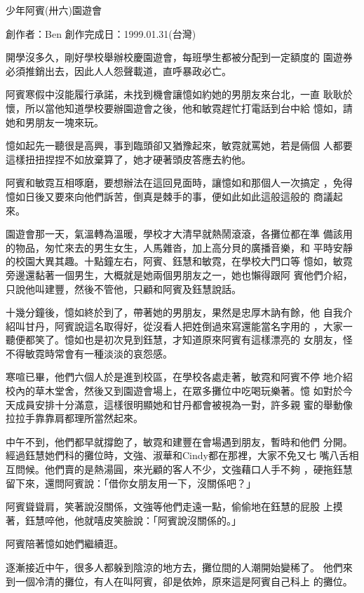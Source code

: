 



少年阿賓(卅六)園遊會

創作者：Ben
創作完成日：1999.01.31(台灣)


開學沒多久，剛好學校舉辦校慶園遊會，每班學生都被分配到一定額度的
園遊券必須推銷出去，因此人人怨聲載道，直呼暴政必亡。

阿賓寒假中沒能履行承諾，未找到機會讓憶如約她的男朋友來台北，一直
耿耿於懷，所以當他知道學校要辦園遊會之後，他和敏霓趕忙打電話到台中給
憶如，請她和男朋友一塊來玩。

憶如起先一聽很是高興，事到臨頭卻又猶豫起來，敏霓就罵她，若是倆個
人都要這樣扭扭捏捏不如放棄算了，她才硬著頭皮答應去約他。

阿賓和敏霓互相啄磨，要想辦法在這回見面時，讓憶如和那個人一次搞定
，免得憶如日後又要來向他們訴苦，倒真是棘手的事，便如此如此這般這般的
商議起來。

園遊會那一天，氣溫轉為溫暖，學校才大清早就熱鬧滾滾，各攤位都在準
備該用的物品，匆忙來去的男生女生，人馬雜沓，加上高分貝的廣播音樂，和
平時安靜的校園大異其趣。十點鐘左右，阿賓、鈺慧和敏霓，在學校大門口等
憶如，敏霓旁邊還黏著一個男生，大概就是她兩個男朋友之一，她也懶得跟阿
賓他們介紹，只說他叫建豐，然後不管他，只顧和阿賓及鈺慧說話。

十幾分鐘後，憶如終於到了，帶著她的男朋友，果然是忠厚木訥有餘，他
自我介紹叫甘丹，阿賓說這名取得好，從沒看人把姓倒過來寫還能當名字用的
，大家一聽便都笑了。憶如也是初次見到鈺慧，才知道原來阿賓有這樣漂亮的
女朋友，怪不得敏霓時常會有一種淡淡的哀怨感。

寒喧已畢，他們六個人於是進到校區，在學校各處走著，敏霓和阿賓不停
地介紹校內的草木堂舍，然後又到園遊會場上，在眾多攤位中吃喝玩樂著。憶
如對於今天成員安排十分滿意，這樣很明顯她和甘丹都會被視為一對，許多親
蜜的舉動像拉拉手靠靠肩都理所當然起來。

中午不到，他們都早就撐飽了，敏霓和建豐在會場遇到朋友，暫時和他們
分開。經過鈺慧她們科的攤位時，文強、淑華和Cindy都在那裡，大家不免又七
嘴八舌相互問候。他們賣的是熱湯圓，來光顧的客人不少，文強藉口人手不夠
，硬拖鈺慧留下來，還問阿賓說：「借你女朋友用一下，沒關係吧？」

阿賓聳聳肩，笑著說沒關係，文強等他們走遠一點，偷偷地在鈺慧的屁股
上摸著，鈺慧啐他，他就嘻皮笑臉說：「阿賓說沒關係的。」

阿賓陪著憶如她們繼續逛。

逐漸接近中午，很多人都躲到陰涼的地方去，攤位間的人潮開始變稀了。
他們來到一個冷清的攤位，有人在叫阿賓，卻是依姈，原來這是阿賓自己科上
的攤位。

